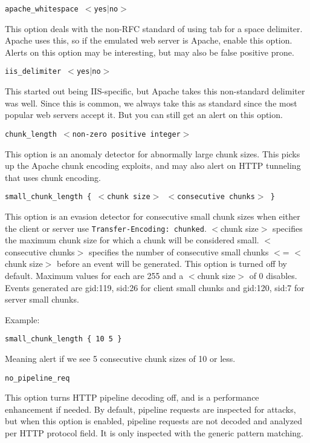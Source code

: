 \documentclass[english]{report}
\newcounter{slistnum}
\newenvironment{slist}
{ \begin{list}{ {\bf \arabic{slistnum}.} }{\usecounter{slistnum} } }
{ \end{list} }
\begin{document}
\begin{slist}
\item \texttt{apache\_whitespace $<$yes$|$no$>$}

This option deals with the non-RFC standard of using tab for a space delimiter.
Apache uses this, so if the emulated web server is Apache, enable this option.
Alerts on this option may be interesting, but may also be false positive prone.

\item \texttt{iis\_delimiter $<$yes$|$no$>$}

This started out being IIS-specific, but Apache takes this non-standard
delimiter was well.  Since this is common, we always take this as standard
since the most popular web servers accept it.  But you can still get an alert
on this option.

\item \texttt{chunk\_length $<$non-zero positive integer$>$}

This option is an anomaly detector for abnormally large chunk sizes.  This
picks up the Apache chunk encoding exploits, and may also alert on HTTP
tunneling that uses chunk encoding.

\item \texttt{small\_chunk\_length \{ $<$chunk size$>$ $<$consecutive chunks$>$ \} }

This option is an evasion detector for consecutive small chunk sizes when
either the client or server use \texttt{Transfer-Encoding: chunked}.
$<$chunk size$>$ specifies the maximum chunk size for which a chunk will be
considered small.  $<$consecutive chunks$>$ specifies the number of consecutive
small chunks $<$= $<$chunk size$>$ before an event will be generated.  This option
is turned off by default.  Maximum values for each are 255 and a $<$chunk size$>$ of 0
disables.  Events generated are gid:119, sid:26 for client small
chunks and gid:120, sid:7 for server small chunks.

Example:
\begin{verbatim}
small_chunk_length { 10 5 }
\end{verbatim}
Meaning alert if we see 5 consecutive chunk sizes of 10 or less.

\item \texttt{no\_pipeline\_req}

This option turns HTTP pipeline decoding off, and is a performance enhancement
if needed.  By default, pipeline requests are inspected for attacks, but when
this option is enabled, pipeline requests are not decoded and analyzed per HTTP
protocol field.  It is only inspected with the generic pattern matching.


\end{slist}
\end{document}
